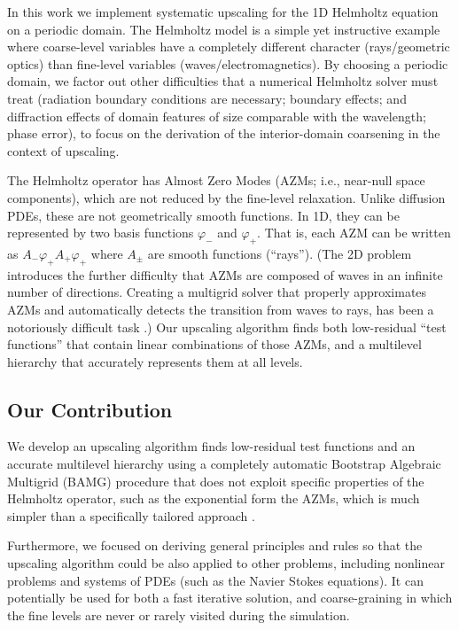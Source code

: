 \documentclass{article}
\begin{document}
In this work we implement systematic upscaling for the 1D Helmholtz equation on a periodic domain. The Helmholtz model is a simple yet instructive example where coarse-level variables have a completely different character (rays/geometric optics) than fine-level variables (waves/electromagnetics). By choosing a periodic domain, we factor out other difficulties that a numerical Helmholtz solver must treat (radiation boundary conditions are necessary; boundary effects; and diffraction effects of domain features of size comparable with the wavelength; phase error), to focus on the derivation of the interior-domain coarsening in the context of upscaling.

The Helmholtz operator has Almost Zero Modes (AZMs; i.e., near-null space components), which are not reduced by the fine-level relaxation. Unlike diffusion PDEs, these are not geometrically smooth functions. In 1D, they can be represented by two basis functions $\varphi_-$ and $\varphi_+$. That is, each AZM can be written as $A_- \varphi_+ A_+ \varphi_+$ where $A_{\pm}$ are smooth functions (``rays''). (The 2D problem introduces the further difficulty that AZMs are composed of waves in an infinite number of directions. Creating a multigrid solver that properly approximates AZMs and automatically detects the transition from waves to rays, has been a notoriously difficult task \cite{wave_ray, later_papers}.) Our upscaling algorithm finds both low-residual ``test functions'' that contain linear combinations of those AZMs, and a multilevel hierarchy that accurately represents them at all levels.

\subsection{Our Contribution}
We develop an upscaling algorithm finds low-residual test functions and an accurate multilevel hierarchy using a completely automatic Bootstrap Algebraic Multigrid (BAMG) procedure that does not exploit specific properties of the Helmholtz operator, such as the exponential form the AZMs, which is much simpler than a specifically tailored approach  \cite{wave_ray, later_papers}.

Furthermore, we focused on deriving general principles and rules so that the upscaling algorithm could be also applied to other problems, including nonlinear problems and systems of PDEs (such as the Navier Stokes equations). It can potentially be used for both a fast iterative solution, and coarse-graining in which the fine levels are never or rarely visited during the simulation.
\end{document}
